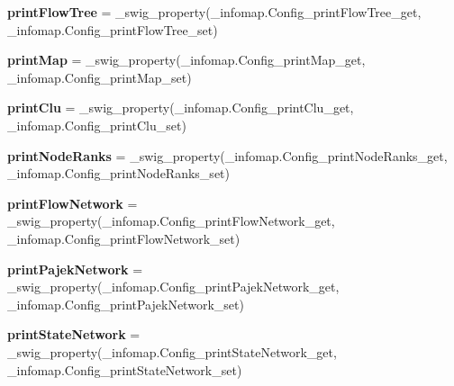 \begin{DoxyCompactItemize}
\mbox{\label{classinfomapfolder_1_1infomap_1_1Config_a450707ece6d8f9a7a55fb7bc8670da5a}} 
{\bfseries print\+Flow\+Tree} = \+\_\+swig\+\_\+property(\+\_\+infomap.\+Config\+\_\+print\+Flow\+Tree\+\_\+get, \+\_\+infomap.\+Config\+\_\+print\+Flow\+Tree\+\_\+set)
\item 
\mbox{\label{classinfomapfolder_1_1infomap_1_1Config_a17e51d0fd3d7bdf968d2db942cc3eabb}} 
{\bfseries print\+Map} = \+\_\+swig\+\_\+property(\+\_\+infomap.\+Config\+\_\+print\+Map\+\_\+get, \+\_\+infomap.\+Config\+\_\+print\+Map\+\_\+set)
\item 
\mbox{\label{classinfomapfolder_1_1infomap_1_1Config_ac4a255b22703181cb60dcfc373a32ebb}} 
{\bfseries print\+Clu} = \+\_\+swig\+\_\+property(\+\_\+infomap.\+Config\+\_\+print\+Clu\+\_\+get, \+\_\+infomap.\+Config\+\_\+print\+Clu\+\_\+set)
\item 
\mbox{\label{classinfomapfolder_1_1infomap_1_1Config_a542bb4735eb94576c9b2767526c42f11}} 
{\bfseries print\+Node\+Ranks} = \+\_\+swig\+\_\+property(\+\_\+infomap.\+Config\+\_\+print\+Node\+Ranks\+\_\+get, \+\_\+infomap.\+Config\+\_\+print\+Node\+Ranks\+\_\+set)
\item 
\mbox{\label{classinfomapfolder_1_1infomap_1_1Config_aec2befd8a8d072d8cf5e5e624e6a882e}} 
{\bfseries print\+Flow\+Network} = \+\_\+swig\+\_\+property(\+\_\+infomap.\+Config\+\_\+print\+Flow\+Network\+\_\+get, \+\_\+infomap.\+Config\+\_\+print\+Flow\+Network\+\_\+set)
\item 
\mbox{\label{classinfomapfolder_1_1infomap_1_1Config_a8e3e2b5175c4a55ffe6bd33eb255c625}} 
{\bfseries print\+Pajek\+Network} = \+\_\+swig\+\_\+property(\+\_\+infomap.\+Config\+\_\+print\+Pajek\+Network\+\_\+get, \+\_\+infomap.\+Config\+\_\+print\+Pajek\+Network\+\_\+set)
\item 
\mbox{\label{classinfomapfolder_1_1infomap_1_1Config_a207dd4b4e463606e957d68c8bb0d957f}} 
{\bfseries print\+State\+Network} = \+\_\+swig\+\_\+property(\+\_\+infomap.\+Config\+\_\+print\+State\+Network\+\_\+get, \+\_\+infomap.\+Config\+\_\+print\+State\+Network\+\_\+set)

\end{DoxyCompactItemize}
